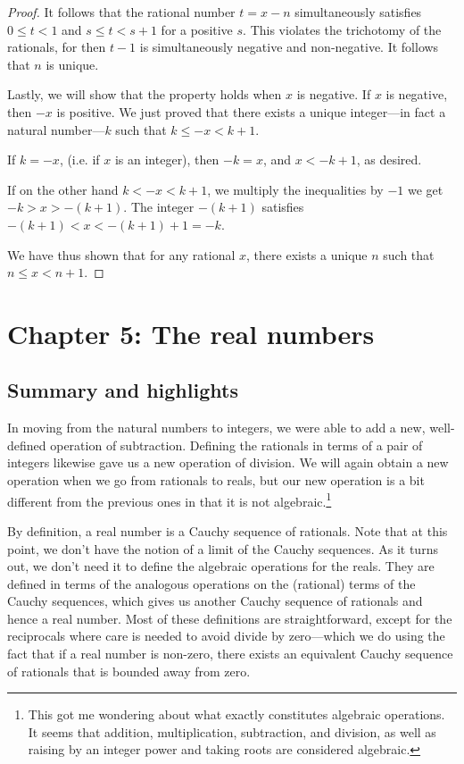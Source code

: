 \documentclass{article}
\begin{document}
\begin{proof}
It follows that the rational number $t = x - n$ simultaneously satisfies $0 \leq t < 1$ and $s \leq t < s + 1$ for a positive $s$. This violates the trichotomy of the rationals, for then $t - 1$ is simultaneously negative and non-negative. It follows that $n$ is unique.

Lastly, we will show that the property holds when $x$ is negative. If $x$ is negative, then $-x$ is positive. We just proved that there exists a unique integer---in fact a natural number---$k$ such that $k \leq -x < k + 1$.

If $k = -x$, (i.e. if $x$ is an integer), then $-k = x$, and $x < -k + 1$, as desired.

If on the other hand $k < -x < k + 1$, we multiply the inequalities by $-1$ we get $-k > x > -(k+1)$. The integer $-(k+1)$ satisfies $-(k+1) < x < -(k+1) + 1 = - k$.

We have thus shown that for any rational $x$, there exists a unique $n$ such that $n \leq x < n + 1$.
\end{proof}

\section*{Chapter 5: The real numbers}
\subsection*{Summary and highlights}
In moving from the natural numbers to integers, we were able to add a new, well-defined operation of subtraction. Defining the rationals in terms of a pair of integers likewise gave us a new operation of division. We will again obtain a new operation when we go from rationals to reals, but our new operation is a bit different from the previous ones in that it is not algebraic.\footnote{This got me wondering about what exactly constitutes algebraic operations. It seems that addition, multiplication, subtraction, and division, as well as raising by an integer power and taking roots are considered algebraic.}

By definition, a real number is a Cauchy sequence of rationals. Note that at this point, we don't have the notion of a limit of the Cauchy sequences. As it turns out, we don't need it to define the algebraic operations for the reals. They are defined in terms of the analogous operations on the (rational) terms of the Cauchy sequences, which gives us another Cauchy sequence of rationals and hence a real number. Most of these definitions are straightforward, except for the reciprocals where care is needed to avoid divide by zero---which we do using the fact that if a real number is non-zero, there exists an equivalent Cauchy sequence of rationals that is bounded away from zero.
\end{document}
